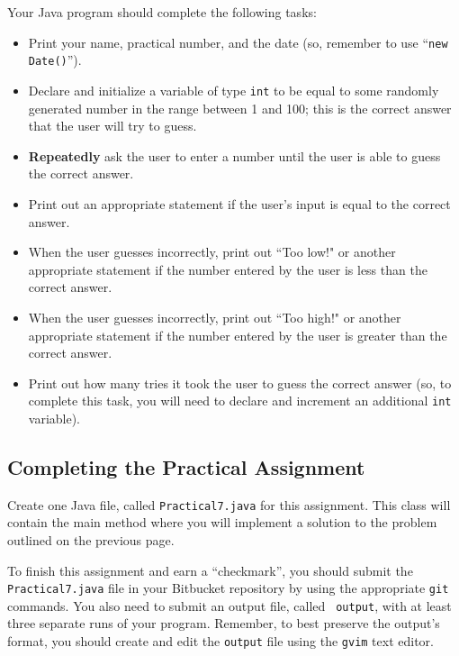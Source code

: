 Your Java program should complete the following tasks:

\begin{itemize}

  \item Print your name, practical number, and the date (so, remember to use ``{\tt new Date()}'').

  \item Declare and initialize a variable of type {\tt int} to be equal to some randomly generated number in the range
    between 1 and 100; this is the correct answer that the user will try to guess.

  \item \textbf{Repeatedly} ask the user to enter a number until the user is able to guess the correct answer.

  \item Print out an appropriate statement if the user's input is equal to the correct answer.

  \item When the user guesses incorrectly, print out ``Too low!" or another appropriate statement if the number entered
    by the user is less than the correct answer.

  \item When the user guesses incorrectly, print out ``Too high!" or another appropriate statement if the number entered
    by the user is greater than the correct answer.

  \item Print out how many tries it took the user to guess the correct answer (so, to complete this task, you will need
    to declare and increment an additional {\tt int} variable).

\end{itemize}

\vspace*{-.1in}
\subsection*{Completing the Practical Assignment}

\vspace*{-.1in}

Create one Java file, called {\tt Practical7.java} for this assignment.  This class will contain the main method where
you will implement a solution to the problem outlined on the previous page.

\noindent To finish this assignment and earn a ``checkmark'', you should submit the {\tt Practical7.java} file in your
Bitbucket repository by using the appropriate {\tt git} commands. You also need to submit an output file, called {\tt
output}, with at least three separate runs of your program. Remember, to best preserve the output's format, you should
create and edit the {\tt output} file using the {\tt gvim} text editor.


